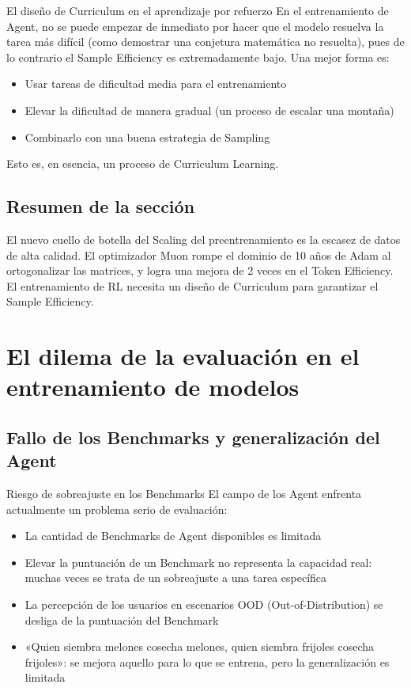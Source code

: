 \documentclass[a4paper]{article}
\begin{document}
\begin{knowledgebox}{El diseño de Curriculum en el aprendizaje por refuerzo}
En el entrenamiento de Agent, no se puede empezar de inmediato por hacer que el modelo resuelva la tarea más difícil (como demostrar una conjetura matemática no resuelta), pues de lo contrario el Sample Efficiency es extremadamente bajo. Una mejor forma es:
\begin{itemize}
    \item Usar tareas de dificultad media para el entrenamiento
    \item Elevar la dificultad de manera gradual (un proceso de escalar una montaña)
    \item Combinarlo con una buena estrategia de Sampling
\end{itemize}
Esto es, en esencia, un proceso de Curriculum Learning.
\end{knowledgebox}

\subsection{Resumen de la sección}

El nuevo cuello de botella del Scaling del preentrenamiento es la escasez de datos de alta calidad. El optimizador Muon rompe el dominio de 10 años de Adam al ortogonalizar las matrices, y logra una mejora de 2 veces en el Token Efficiency. El entrenamiento de RL necesita un diseño de Curriculum para garantizar el Sample Efficiency.

\section{El dilema de la evaluación en el entrenamiento de modelos}

\subsection{Fallo de los Benchmarks y generalización del Agent}

\begin{warningbox}{Riesgo de sobreajuste en los Benchmarks}
El campo de los Agent enfrenta actualmente un problema serio de evaluación:
\begin{itemize}
    \item La cantidad de Benchmarks de Agent disponibles es limitada
    \item Elevar la puntuación de un Benchmark no representa la capacidad real: muchas veces se trata de un sobreajuste a una tarea específica
    \item La percepción de los usuarios en escenarios OOD (Out-of-Distribution) se desliga de la puntuación del Benchmark
    \item «Quien siembra melones cosecha melones, quien siembra frijoles cosecha frijoles»: se mejora aquello para lo que se entrena, pero la generalización es limitada
\end{itemize}
\end{warningbox}
\end{document}
